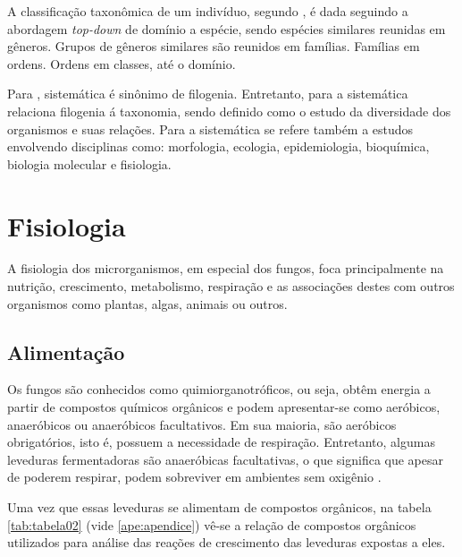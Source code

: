 \documentclass[tcc2]{classe_uftex/uftex}
\begin{document}
A classificação taxonômica de um indivíduo, segundo , é dada seguindo a abordagem \emph{top-down} de domínio a espécie, sendo espécies similares reunidas em gêneros. Grupos de gêneros similares são reunidos em famílias. Famílias em ordens. Ordens em classes, até o domínio.

Para , sistemática é sinônimo de filogenia. Entretanto, para  a sistemática relaciona filogenia á taxonomia, sendo definido como o estudo da diversidade dos organismos e suas relações. Para  a sistemática se refere também a estudos envolvendo disciplinas como: morfologia, ecologia, epidemiologia, bioquímica, biologia molecular e fisiologia. %

    

\section{Fisiologia}
\label{sec:fisiologia}
A fisiologia dos microrganismos, em especial dos fungos, foca principalmente na nutrição, crescimento, metabolismo, respiração e as associações destes com outros organismos como plantas, algas, animais ou outros.

    \subsection{Alimentação}
    \label{subsec:alimentacao}
    Os fungos são conhecidos como quimiorganotróficos, ou seja, obtêm energia a partir de compostos químicos orgânicos \cite{2016:Madigan} e podem apresentar-se como aeróbicos, anaeróbicos ou anaeróbicos facultativos. Em sua maioria, são aeróbicos obrigatórios, isto é, possuem a necessidade de respiração. Entretanto, algumas leveduras fermentadoras são anaeróbicas facultativas, o que significa que apesar de poderem respirar, podem sobreviver em ambientes sem oxigênio \cite{2016:Madigan}\cite{2008:Trabulsi}.
    
    Uma vez que essas leveduras se alimentam de compostos orgânicos, na tabela \ref{tab:tabela02} (vide \ref{ape:apendice}) vê-se a relação de compostos orgânicos utilizados para análise das reações de crescimento das leveduras expostas a eles.
    
\end{document}
